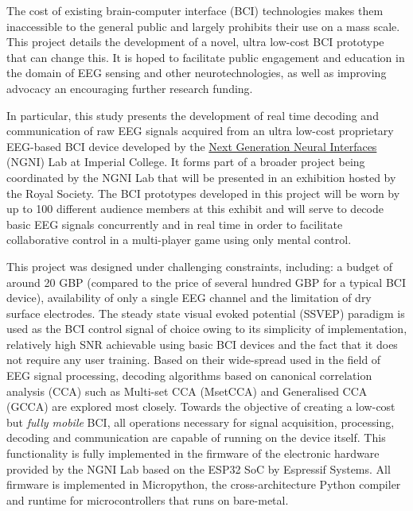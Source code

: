 \noindent
The cost of existing brain-computer interface (BCI) technologies makes them inaccessible to the general public and largely prohibits their use on a mass scale. This project details the development of a novel, ultra low-cost BCI prototype that can change this. It is hoped to facilitate public engagement and education in the domain of EEG sensing and other neurotechnologies, as well as improving advocacy an encouraging further research funding.
\vspace{0.4cm}

\noindent
In particular, this study presents the development of real time decoding and communication of raw EEG signals acquired from an ultra low-cost proprietary EEG-based BCI device developed by the \href{https://www.imperial.ac.uk/next-generation-neural-interfaces/}{Next Generation Neural Interfaces} (NGNI) Lab at Imperial College. It forms part of a broader project being coordinated by the NGNI Lab that will be presented in an exhibition hosted by the Royal Society. The BCI prototypes developed in this project will be worn by up to 100 different audience members at this exhibit and will serve to decode basic EEG signals concurrently and in real time in order to facilitate collaborative control in a multi-player game using only mental control.
\vspace{0.4cm}

\noindent
This project was designed under challenging constraints, including: a budget of around 20 GBP (compared to the price of several hundred GBP for a typical BCI device), availability of only a single EEG channel and the limitation of dry surface electrodes. The steady state visual evoked potential (SSVEP) paradigm is used as the BCI control signal of choice owing to its simplicity of implementation, relatively high SNR achievable using basic BCI devices and the fact that it does not require any user training. Based on their wide-spread used in the field of EEG signal processing, decoding algorithms based on canonical correlation analysis (CCA) such as Multi-set CCA (MsetCCA) and Generalised CCA (GCCA) are explored most closely. Towards the objective of creating a low-cost but \textit{fully mobile} BCI, all operations necessary for signal acquisition, processing, decoding and communication are capable of running on the device itself. This functionality is fully implemented in the firmware of the electronic hardware provided by the NGNI Lab based on the ESP32 SoC by Espressif Systems. All firmware is implemented in Micropython, the cross-architecture Python compiler and runtime for microcontrollers that runs on bare-metal.
\vspace{0.4cm}

